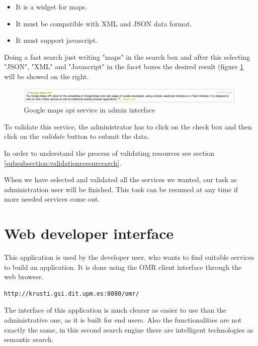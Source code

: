 \begin{itemize}
	\item It is a widget for maps.
	\item It must be compatible with XML and JSON data format.
	\item It must support javascript.
\end{itemize}

Doing a fast search just writing "maps" in the search box and after this selecting "JSON", "XML" and "Javascript" in the facet boxes the desired result (figure \ref{fig:googlemapsapi} will be showed on the right.

\begin{figure}[h]
	\centering
	\includegraphics[width=400pt]{graphics/google-maps-api.png}
	\caption{Google maps api service in admin interface}
	\label{fig:googlemapsapi}
\end{figure}

To validate this service, the administrator has to click on the check box and then click on the \textit{validate} button to submit the data.

In order to understand the process of validating resources see section \ref{subsubsection:validationresourcearch}.

When we have selected and validated all the services we wanted, our task as administration user will be finished. This task can be resumed at any time if more needed services come out.

\section{Web developer interface}
This application is used by the developer user, who wants to find suitable services to build an application.
It is done using the OMR client interface through the web browser.

\begin{lstlisting}[style=consola,label={lst:runranking}]
http://krusti.gsi.dit.upm.es:8080/omr/
\end{lstlisting}

The interface of this application is much clearer as easier to use than the administrative one, as it is built for end users. Also the functionalities are not exactly the same, in this second search engine there are intelligent technologies as semantic search.

